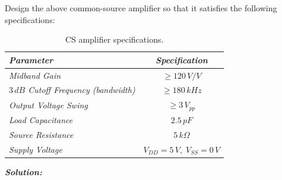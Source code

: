 \documentclass[12pt, fleqn]{article}
\begin{document}
Design the above common-source amplifier so that it satisfies the following specifications:
\begin{table}[H]
\centering
\setlength{\tabcolsep}{20pt}
\renewcommand{\arraystretch}{1.5}
\begin{tabular}{|l|c|}
    \hline
    \textit{\textbf{Parameter}} & \textit{\textbf{Specification}}\\
    \hline
    \textit{Midband Gain} & $\geq 120\,V/V$\\
    \hline
    \textit{$3\,dB$ Cutoff Frequency (bandwidth)} & $\geq 180\,kHz$\\
    \hline
    \textit{Output Voltage Swing} & $\geq 3\,V_{pp}$\\
    \hline
    \textit{Load Capacitance} & $2.5\,pF$\\
    \hline
    \textit{Source Resistance} & $5\,k\Omega$\\
    \hline
    \textit{Supply Voltage} & $V_{DD} = 5\,V,\;V_{SS} = 0\,V$\\
    \hline
\end{tabular}
\caption{CS amplifier specifications.
\label{tab:cs_specs}} 
\end{table}
\newpage\noindent
\textbf{\emph{Solution: }}
\end{document}

